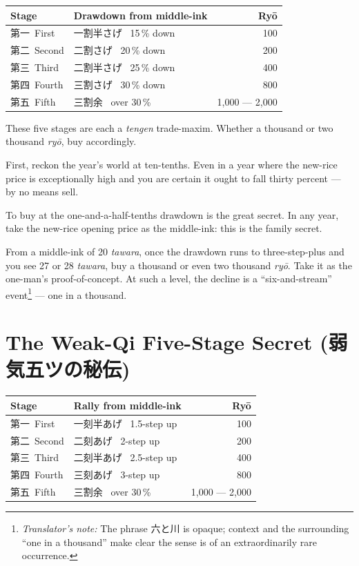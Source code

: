 \documentclass[10pt, openany]{book}
\newcommand{\jp}[1]{{\japanesefont #1}}
\newcommand{\tn}[1]{\footnote{\textit{Translator's note:} #1}}
\begin{document}
\begin{center}
\begin{tabular}{@{}l l r@{}}
\toprule
\textbf{Stage} & \textbf{Drawdown from middle-ink} & \textbf{Ry\=o}\\
\midrule
\jp{第一}\ First   & \jp{一割半さげ}  \ 15\,\% down      & 100\\
\jp{第二}\ Second  & \jp{二割さげ}    \ 20\,\% down      & 200\\
\jp{第三}\ Third   & \jp{二割半さげ}  \ 25\,\% down      & 400\\
\jp{第四}\ Fourth  & \jp{三割さげ}    \ 30\,\% down      & 800\\
\jp{第五}\ Fifth   & \jp{三割余}      \ over 30\,\%      & 1{,}000 --- 2{,}000\\
\bottomrule
\end{tabular}
\end{center}

These five stages are each a \textit{tengen} trade-maxim. Whether
a thousand or two thousand \textit{ry\=o}, buy accordingly.

First, reckon the year's world at ten-tenths. Even in a year
where the new-rice price is exceptionally high and you are certain
it ought to fall thirty percent --- by no means sell.

To buy at the one-and-a-half-tenths drawdown is the great secret.
In any year, take the new-rice opening price as the middle-ink:
this is the family secret.

From a middle-ink of 20 \textit{tawara}, once the drawdown runs
to three-step-plus and you see 27 or 28 \textit{tawara}, buy a
thousand or even two thousand \textit{ry\=o}. Take it as the
one-man's proof-of-concept. At such a level, the decline is a
``six-and-stream'' event\tn{The phrase \jp{六と川} is opaque;
context and the surrounding ``one in a thousand'' make clear the
sense is of an extraordinarily rare occurrence.} --- one in a
thousand.

\section{The Weak-Qi Five-Stage Secret (\jp{弱気五ツの秘伝})}

\begin{center}
\begin{tabular}{@{}l l r@{}}
\toprule
\textbf{Stage} & \textbf{Rally from middle-ink} & \textbf{Ry\=o}\\
\midrule
\jp{第一}\ First   & \jp{一刻半あげ}  \ 1.5-step up        & 100\\
\jp{第二}\ Second  & \jp{二刻あげ}    \ 2-step up          & 200\\
\jp{第三}\ Third   & \jp{二刻半あげ}  \ 2.5-step up        & 400\\
\jp{第四}\ Fourth  & \jp{三刻あげ}    \ 3-step up          & 800\\
\jp{第五}\ Fifth   & \jp{三割余}      \ over 30\,\%        & 1{,}000 --- 2{,}000\\
\bottomrule
\end{tabular}
\end{center}
\end{document}
